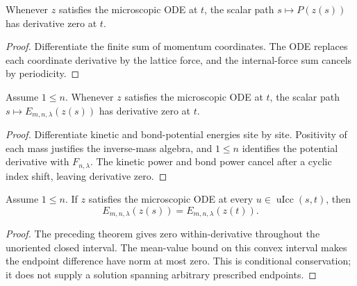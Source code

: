 \begin{theorem}
\label{thm:microscopic:momentum-derivative-zero}
Whenever $z$ satisfies the microscopic ODE at $t$, the scalar path
$s\mapsto P(z(s))$ has derivative zero at $t$.
\end{theorem}
\begin{proof}

\leanok
Differentiate the finite sum of momentum coordinates.  The ODE replaces each
coordinate derivative by the lattice force, and the internal-force sum
cancels by periodicity.
\end{proof}

\begin{theorem}
\label{thm:microscopic:energy-derivative-zero}
Assume $1\le n$.  Whenever $z$ satisfies the microscopic ODE at $t$, the
scalar path $s\mapsto E_{m,n,\lambda}(z(s))$ has derivative zero at $t$.
\end{theorem}
\begin{proof}

\leanok
Differentiate kinetic and bond-potential energies site by site.  Positivity of
each mass justifies the inverse-mass algebra, and $1\le n$ identifies the
potential derivative with $F_{n,\lambda}$.  The kinetic power and bond power
cancel after a cyclic index shift, leaving derivative zero.
\end{proof}

\begin{theorem}
\label{thm:microscopic:energy-endpoints}
Assume $1\le n$.  If $z$ satisfies the microscopic ODE at every
$u\in\operatorname{uIcc}(s,t)$, then
\[
  E_{m,n,\lambda}(z(s))=E_{m,n,\lambda}(z(t)).
\]
\end{theorem}
\begin{proof}

\leanok
The preceding theorem gives zero within-derivative throughout the unoriented
closed interval.  The mean-value bound on this convex interval makes the
endpoint difference have norm at most zero.  This is conditional conservation;
it does not supply a solution spanning arbitrary prescribed endpoints.
\end{proof}

